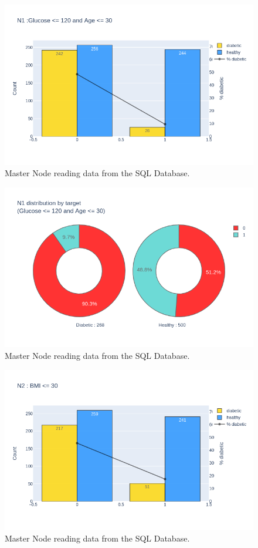 \documentclass[12pt]{article}
\begin{document}
\begin{figure}[ht]
\centering
\includegraphics[width=1\textwidth]{newplot(13).png}
\caption{Master Node reading data from the SQL Database.}
\end{figure}

\begin{figure}[ht]
\centering
\includegraphics[width=1\textwidth]{newplot(14).png}
\caption{Master Node reading data from the SQL Database.}
\end{figure}

\begin{figure}[ht]
\centering
\includegraphics[width=1\textwidth]{newplot(15).png}
\caption{Master Node reading data from the SQL Database.}
\end{figure}
\end{document}
